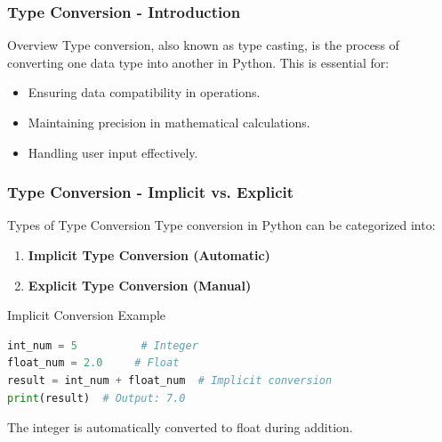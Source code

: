 \documentclass{beamer}
\begin{document}
\begin{frame}[fragile]
    \frametitle{Type Conversion - Introduction}
    \begin{block}{Overview}
        Type conversion, also known as type casting, is the process of converting one data type into another in Python. 
        This is essential for:
        \begin{itemize}
            \item Ensuring data compatibility in operations.
            \item Maintaining precision in mathematical calculations.
            \item Handling user input effectively.
        \end{itemize}
    \end{block}
\end{frame}

\begin{frame}[fragile]
    \frametitle{Type Conversion - Implicit vs. Explicit}
    \begin{block}{Types of Type Conversion}
        Type conversion in Python can be categorized into:
        \begin{enumerate}
            \item \textbf{Implicit Type Conversion (Automatic)}
            \item \textbf{Explicit Type Conversion (Manual)}
        \end{enumerate}
    \end{block}

    \begin{block}{Implicit Conversion Example}
        \begin{lstlisting}[language=Python]
int_num = 5          # Integer
float_num = 2.0     # Float
result = int_num + float_num  # Implicit conversion
print(result)  # Output: 7.0
        \end{lstlisting}
        The integer is automatically converted to float during addition.
    \end{block}
\end{frame}
\end{document}
